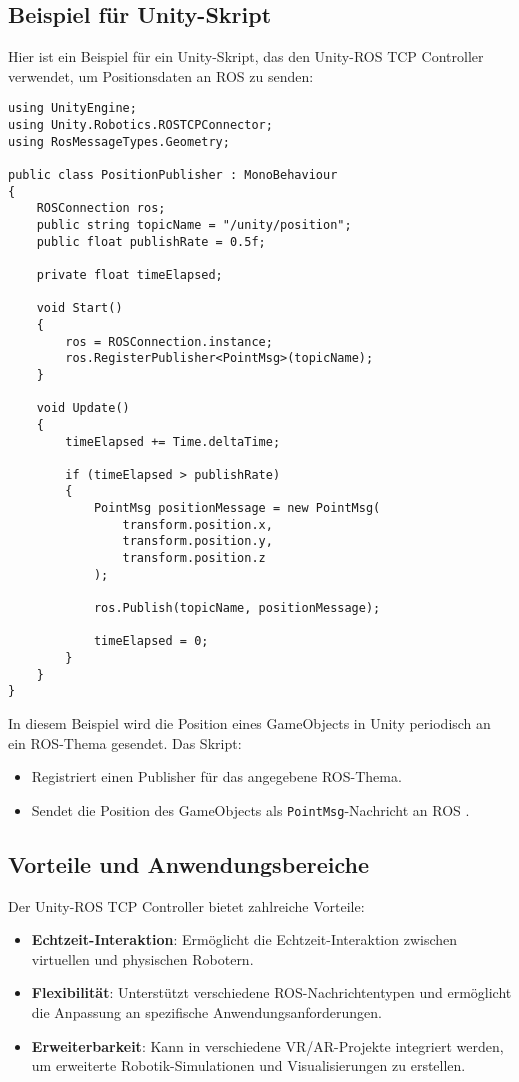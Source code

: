 \subsection{Beispiel für Unity-Skript}

Hier ist ein Beispiel für ein Unity-Skript, das den Unity-ROS TCP Controller verwendet, um Positionsdaten an ROS zu senden:

\begin{verbatim}
using UnityEngine;
using Unity.Robotics.ROSTCPConnector;
using RosMessageTypes.Geometry;

public class PositionPublisher : MonoBehaviour
{
    ROSConnection ros;
    public string topicName = "/unity/position";
    public float publishRate = 0.5f;

    private float timeElapsed;

    void Start()
    {
        ros = ROSConnection.instance;
        ros.RegisterPublisher<PointMsg>(topicName);
    }

    void Update()
    {
        timeElapsed += Time.deltaTime;

        if (timeElapsed > publishRate)
        {
            PointMsg positionMessage = new PointMsg(
                transform.position.x,
                transform.position.y,
                transform.position.z
            );

            ros.Publish(topicName, positionMessage);

            timeElapsed = 0;
        }
    }
}
\end{verbatim}
\noindent
In diesem Beispiel wird die Position eines GameObjects in Unity periodisch an ein ROS-Thema gesendet. Das Skript:

\begin{itemize}
    \item Registriert einen Publisher für das angegebene ROS-Thema.
    \item Sendet die Position des GameObjects als \texttt{PointMsg}-Nachricht an ROS \cite{unity_ros_tcp_connector}.
\end{itemize}

\subsection{Vorteile und Anwendungsbereiche}

Der Unity-ROS TCP Controller bietet zahlreiche Vorteile:

\begin{itemize}
    \item \textbf{Echtzeit-Interaktion}: Ermöglicht die Echtzeit-Interaktion zwischen virtuellen und physischen Robotern.
    \item \textbf{Flexibilität}: Unterstützt verschiedene ROS-Nachrichtentypen und ermöglicht die Anpassung an spezifische Anwendungsanforderungen.
    \item \textbf{Erweiterbarkeit}: Kann in verschiedene VR/AR-Projekte integriert werden, um erweiterte Robotik-Simulationen und Visualisierungen zu erstellen.
\end{itemize}

